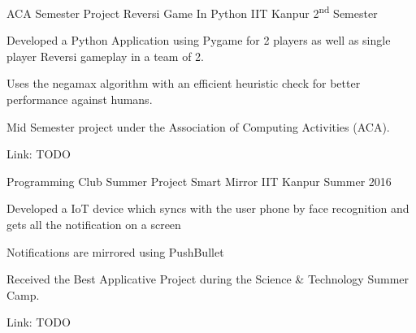 

\begin{cventries}

  \cventry
  {ACA Semester Project} %
  {Reversi Game In Python} %
  {IIT Kanpur} %
  {2\textsuperscript{nd} Semester} %
  {
    \begin{cvitems} %
    \item {Developed a Python Application using Pygame for 2 players as well
        as single player Reversi gameplay in a team of 2.}
    \item {Uses the negamax algorithm with an efficient heuristic check
        for better performance against humans.}
    \item{Mid Semester project under the Association of Computing
        Activities (ACA).}
    \item {Link: TODO}
    \end{cvitems}
  }

  \cventry
  {Programming Club Summer Project} %
  {Smart Mirror} %
  {IIT Kanpur} %
  {Summer 2016} %
  {
    \begin{cvitems} %
    \item {Developed a IoT device which syncs with the user phone by face
        recognition and gets all the notification on a screen }
    \item {Notifications are mirrored using PushBullet}
    \item {Received the Best Applicative Project during the Science \&
        Technology Summer Camp.}
    \item {Link: TODO}
    \end{cvitems}
  }

\end{cventries}
